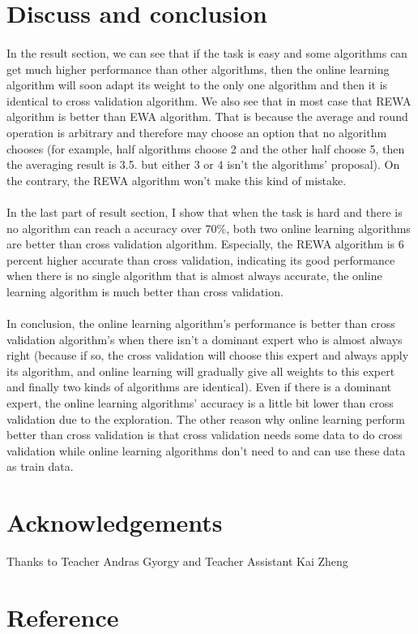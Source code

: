\documentclass{gapd}
\begin{document}


\section{Discuss and conclusion}
\label{sec:discuss_conclusion}
\paragraph{}
\lettrine{I}{}n the result section, we can see that if the task is easy and some algorithms can get much higher performance than other algorithms, then the online learning algorithm will soon adapt its weight to the only one algorithm and then it is identical to cross validation algorithm. We also see that in most case that REWA algorithm is better than EWA algorithm. That is because the average and round operation is arbitrary and therefore may choose an option that no algorithm chooses (for example, half algorithms choose 2 and the other half choose 5, then the averaging result is 3.5. but either 3 or 4 isn't the algorithms' proposal). On the contrary, the REWA algorithm won't make this kind of mistake. 
\paragraph{}
	In the last part of result section, I show that when the task is hard and there is no algorithm can reach a accuracy over 70\%, both two online learning algorithms are better than cross validation algorithm. Especially, the REWA algorithm is 6 percent higher accurate than cross validation, indicating its good performance when there is no single algorithm that is almost always accurate, the online learning algorithm is much better than cross validation. 
\paragraph{}
	In conclusion, the online learning algorithm's performance is better than cross validation algorithm's when there isn't a dominant expert who is almost always right (because if so, the cross validation will choose this expert and always apply its algorithm, and online learning will gradually give all weights to this expert and finally two kinds of algorithms are identical). Even if there is a dominant expert, the online learning algorithms' accuracy is a little bit lower than cross validation due to the exploration. The other reason why online learning  perform better than cross validation is that cross validation needs some data to do cross validation while online learning algorithms don't need to and can use these data as train data. 
		


\section*{Acknowledgements}

Thanks to Teacher Andras Gyorgy and Teacher Assistant Kai Zheng

\section{Reference}

\end{document}
